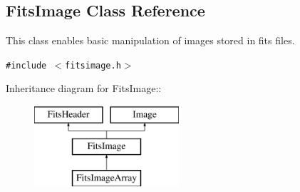 \subsection{Fits\-Image  Class Reference}
\label{class_fitsimage}
This class enables basic manipulation of images stored in fits files. 


{\tt \#include $<$fitsimage.h$>$}

Inheritance diagram for Fits\-Image::\begin{figure}[H]
\begin{center}
\leavevmode
\includegraphics[height=3cm]{class_fitsimage}
\end{center}
\end{figure}
